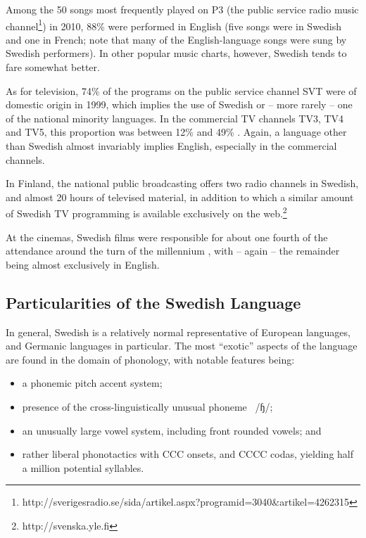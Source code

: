 \begin{multicols}{2}
Among the 50 songs most frequently played on P3 (the public service
radio music
channel\footnote{http://sverigesradio.se/sida/artikel.aspx?programid=3040\&artikel=4262315})
in 2010, 88\% were performed in English (five songs were in Swedish
and one in French; note that many of the English-language songs were
sung by Swedish performers). In other popular music charts, however,
Swedish tends to fare somewhat better.

As for television, 74\% of the programs on the public service channel
SVT were of domestic origin in 1999, which implies the use of Swedish
or -- more rarely -- one of the national minority languages. In the
commercial TV channels TV3, TV4 and TV5, this proportion was between
12\% and 49\% \cite[79]{falk2001}. Again, a language other than Swedish
almost invariably implies English, especially in the commercial
channels.

In Finland, the national public broadcasting offers two radio channels
in Swedish, and almost 20 hours of televised material, in addition to
which a similar amount of Swedish TV programming is available
exclusively on the web.\footnote{http://svenska.yle.fi}

At the cinemas, Swedish films were responsible for about one fourth of
the attendance around the turn of the millennium \cite[85]{falk2001},
with -- again -- the remainder being almost exclusively in English.


\subsection{Particularities of the Swedish Language}

In general, Swedish is a relatively normal representative of European
languages, and Germanic languages in particular. The most ``exotic''
aspects of the language are found in the domain of phonology, with
notable features being:

\begin{itemize}    
\item a phonemic pitch accent system;
\item presence of the cross-linguistically unusual
  phoneme~{ /ɧ/};
\item an unusually large vowel system, including front rounded vowels; and 
\item rather liberal phonotactics with CCC onsets, and CCCC codas, yielding half a million potential syllables.
\end{itemize}


\end{multicols}
